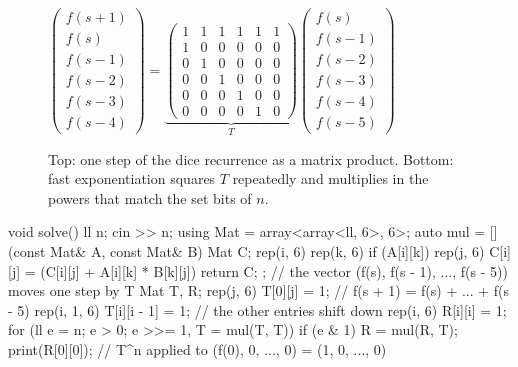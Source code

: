 \begin{figure}[htbp]
\centering
\small
$\begin{pmatrix} f(s+1) \\ f(s) \\ f(s-1) \\ f(s-2) \\ f(s-3) \\ f(s-4) \end{pmatrix} =
\underbrace{\begin{pmatrix} 1&1&1&1&1&1 \\ 1&0&0&0&0&0 \\ 0&1&0&0&0&0 \\ 0&0&1&0&0&0 \\ 0&0&0&1&0&0 \\ 0&0&0&0&1&0
\end{pmatrix}}_{T}
\begin{pmatrix} f(s) \\ f(s-1) \\ f(s-2) \\ f(s-3) \\ f(s-4) \\ f(s-5) \end{pmatrix}$
\par\bigskip
{}
\caption{Top: one step of the dice recurrence as a matrix product. Bottom: fast exponentiation squares $T$ repeatedly and
multiplies in the powers that match the set bits of $n$.}
\label{fig:matpow}
\end{figure}

\begin{code}
void solve() {
    ll n;
    cin >> n;
    using Mat = array<array<ll, 6>, 6>;
    auto mul = [](const Mat& A, const Mat& B) {
        Mat C{};
        rep(i, 6) rep(k, 6) if (A[i][k]) rep(j, 6)
            C[i][j] = (C[i][j] + A[i][k] * B[k][j]) %
        return C;
    };
    // the vector (f(s), f(s - 1), ..., f(s - 5)) moves one step by T
    Mat T{}, R{};
    rep(j, 6) T[0][j] = 1;  // f(s + 1) = f(s) + ... + f(s - 5)
    rep(i, 1, 6) T[i][i - 1] = 1;  // the other entries shift down
    rep(i, 6) R[i][i] = 1;
    for (ll e = n; e > 0; e >>= 1, T = mul(T, T))
        if (e & 1) R = mul(R, T);
    print(R[0][0]);  // T^n applied to (f(0), 0, ..., 0) = (1, 0, ..., 0)
}
\end{code}

